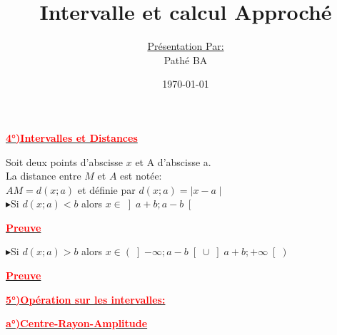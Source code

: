 \documentclass[12pt]{article}
\author{\underline{Présentation Par:}\\Pathé BA}
\title{\textbf{Intervalle et calcul Approché}}
\date{\today}
\begin{document}
\maketitle
\newpage
\begin{center}
\underline{\textbf{\textcolor{red}{4°)Intervalles et Distances}}}\\
\end{center}
Soit deux points d'abscisse $x$ et A d'abscisse a.\\
La distance entre $M$ et $A$ est notée:\\
$AM=d(x;a)$ et définie par  $d(x;a)=\mid x-a \mid $\\
$\blacktriangleright$Si $d(x;a)<b$ alors $x\in\left] a+b;a-b\right[ $

\begin{center}
\underline{\textbf{\textcolor{red}{Preuve}}}\\
\end{center}
$\blacktriangleright$Si $d(x;a)>b$ alors $x\in \left( \left] -\infty; a-b\right[ \cup \left] a+b;+\infty\right[\right)$\\

\begin{center}
\underline{\textbf{\textcolor{red}{Preuve}}}\\
\end{center}

\begin{center}
\underline{\textbf{\textcolor{red}{5°)Opération sur les intervalles:}}}\\
\end{center}

\begin{center}
\underline{\textbf{\textcolor{red}{a°)Centre-Rayon-Amplitude}}}\\
\end{center}
\end{document}
